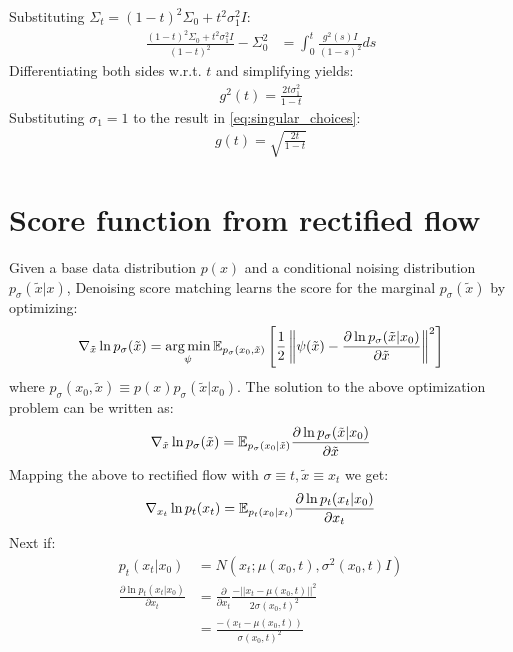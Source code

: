 Substituting $\Sigma_t = (1-t)^2\Sigma_0 + t^2\sigma_1^2I$:
\begin{align}
\frac{(1-t)^2\Sigma_0 + t^2\sigma_1^2I}{(1-t)^2} - \Sigma_0^2 &= \int_0^t\frac{g^2(s)I}{(1-s)^2}ds
\end{align}
Differentiating both sides w.r.t. $t$ and simplifying yields:
\begin{align}
g^2(t) = \frac{2t\sigma_1^2}{1-t}
\end{align}
Substituting $\sigma_1 = 1$ to the result in \cref{eq:singular_choices}:
\begin{align}
g(t) = \sqrt{\frac{2t}{1-t}}
\end{align}

\section{Score function from rectified flow}
\label{sec:score_fn_app}
Given a base data distribution $p(x)$ and a conditional noising distribution $p_\sigma(\tilde  x | x)$, Denoising score matching \cite{vincent2011connection} learns the score for the marginal $p_\sigma(\tilde x)$ by optimizing:
\begin{equation}
\nabla_{\tilde x} \ln p_\sigma(\tilde x) = \operatorname*{arg\,min}_{\psi} \mathbb{E}_{p_\sigma(x_0, \tilde x)} \left[ \frac{1}{2} \left\lVert \psi(\tilde x) - \frac{\partial \ln p_{\sigma}(\tilde x | x_0)}{\partial \tilde x} \right\lVert^2\right]
\end{equation}
where $p_\sigma(x_0, \tilde x) \equiv p(x)p_\sigma(\tilde x| x_0)$.
The solution to the above optimization problem can be written as:
\begin{equation}
\nabla_{\tilde x} \ln p_\sigma(\tilde x) = \mathbb{E}_{p_\sigma(x_0|\tilde x)} \frac{\partial \ln p_{\sigma}(\tilde x | x_0)}{\partial \tilde x}
\end{equation}
Mapping the above to rectified flow with $\sigma \equiv t, \tilde x \equiv x_t$ we get:
\begin{equation}
\label{eq:dsm_solution}
\nabla_{x_t} \ln p_t(x_t) = \mathbb{E}_{p_t(x_0|x_t)} \frac{\partial \ln p_t(x_t | x_0)}{\partial x_t}
\end{equation}
Next if:
\begin{align}
p_t(x_t | x_0) &= N(x_t; \mu(x_0, t), \sigma^2(x_0, t)I) \\
\frac{\partial \ln p_t(x_t | x_0)}{\partial x_t} &= \frac{\partial}{\partial x_t}\frac{-||x_t - \mu(x_0, t)||^2}{2\sigma(x_0, t)^2} \\
&= \frac{-(x_t - \mu(x_0, t))}{\sigma(x_0, t)^2}
\end{align}
